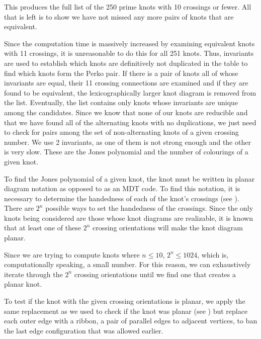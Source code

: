 \begin{paper}

This produces the full list of the 250 prime knots with 10 crossings or fewer.
All that is left is to show we have not missed any more pairs of knots that are
equivalent.


Since the computation time is massively increased by examining equivalent knots
with 11 crossings, it is unreasonable to do this for all 251 knots.
Thus, invariants are used to establish which knots are definitively not
duplicated in the table to find which knots form the Perko pair.
If there is a pair of knots all of whose invariants are equal, their 11 crossing
connections are examined and if they are found to be equivalent, the
lexicographically larger knot diagram is removed from the list.
Eventually, the list contains only knots whose invariants are unique among the
candidates.
Since we know that none of our knots are reducible and that we have found all of
the alternating knots with no duplications, we just need to check for pairs
among the set of non-alternating knots of a given crossing number.
We use 2 invariants, as one of them is not strong enough and the other is very
slow.
These are the Jones polynomial and the number of colourings of a given knot.



To find the Jones polynomial of a given knot, the knot must be written in planar
diagram notation as opposed to as an MDT code.
To find this notation, it is necessary to determine the handedness of each of
the knot's crossings (see \figCrossings).
There are $2^n$ possible ways to set the handedness of the crossings.
Since the only knots being considered are those whose knot diagrams are
realizable, it is known that at least one of these $2^n$ crossing orientations
will make the knot diagram planar.

Since we are trying to compute knots where $n\leq10$, $2^n\leq1024$, which is,
computationally speaking, a small number.
For this reason, we can exhaustively iterate through the $2^n$ crossing
orientations until we find one that creates a planar knot.

To test if the knot with the given crossing orientations is planar, we apply the
same replacement as we used to check if the knot was planar (see \figGraph)
but replace each outer edge with a ribbon, a pair of parallel edges to adjacent
vertices, to ban the last edge configuration that was allowed earlier.\\


\end{paper}
